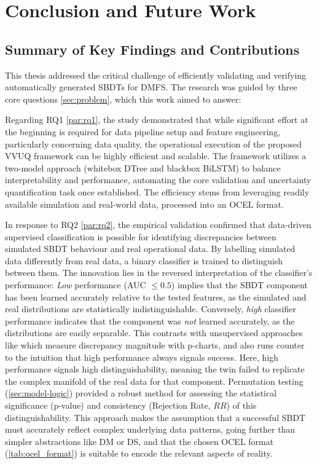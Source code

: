 \chapter{Conclusion and Future Work}
\label{chap:conclusion}

\section{Summary of Key Findings and Contributions}
\label{sec:conclusion_summary_findings}

This thesis addressed the critical challenge of efficiently validating and verifying automatically generated SBDTs for DMFS. The research was guided by three core questions \autoref{sec:problem}, which this work aimed to answer:

Regarding RQ1 \autoref{par:rq1}, the study demonstrated that while significant effort at the beginning is required for data pipeline setup and feature engineering, particularly concerning data quality, the operational execution of the proposed VVUQ framework can be highly efficient and scalable. The framework utilizes a two-model approach (whitebox DTree and blackbox BiLSTM) to balance interpretability and performance, automating the core validation and uncertainty quantification task once established. The efficiency stems from leveraging readily available simulation and real-world data, processed into an OCEL format.

In response to RQ2 \autoref{par:rq2}, the empirical validation confirmed that data-driven supervised classification is possible for identifying discrepancies between simulated SBDT behaviour and real operational data. By labelling simulated data differently from real data, a binary classifier is trained to distinguish between them. The innovation lies in the reversed interpretation of the classifier's performance: \textit{Low} performance (AUC $\le 0.5$) implies that the SBDT component has been learned accurately relative to the tested features, as the simulated and real distributions are statistically indistinguishable. Conversely, \textit{high} classifier performance indicates that the component was \textit{not} learned accurately, as the distributions are easily separable. This contrasts with unsupervised approaches like \autocite{dos2024digital} which measure discrepancy magnitude with p-charts, and also runs counter to the intuition that high performance always signals success. Here, high performance signals high distinguishability, meaning the twin failed to replicate the complex manifold of the real data for that component. Permutation testing (\autoref{sec:model-logic}) provided a robust method for assessing the statistical significance (p-value) and consistency (Rejection Rate, $RR$) of this distinguishability. This approach makes the assumption that a successful SBDT must accurately reflect complex underlying data patterns, going further than simpler abstractions like DM or DS, and that the chosen OCEL format (\autoref{tab:ocel_format}) is suitable to encode the relevant aspects of reality.

